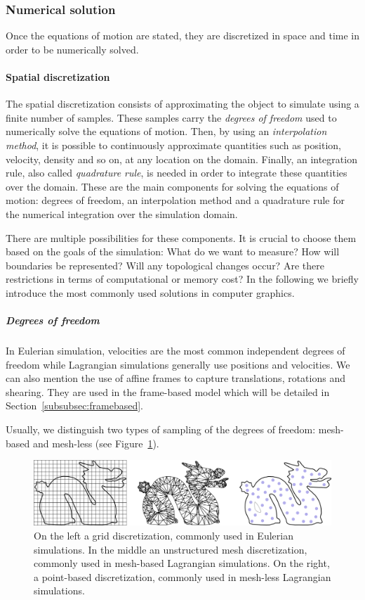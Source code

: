 \subsubsection{Numerical solution}
\label{subsubsec:starMechanics_numericalSolution}
Once the equations of motion are stated, they are discretized in space and time in order to be numerically solved.

\paragraph{Spatial discretization}
The spatial discretization consists of approximating the object to simulate using a finite number of samples. 
These samples carry the \emph{degrees of freedom} used to numerically solve the equations of motion.
Then, by using an \emph{interpolation method}, it is possible to continuously approximate quantities such as position, velocity, density and so on, at any location on the domain. 
Finally, an integration rule, also called \emph{quadrature rule}, is needed in order to integrate these quantities over the domain. 
These are the main components for solving the equations of motion:
degrees of freedom, an interpolation method and a quadrature rule for the numerical integration over the simulation domain.

There are multiple possibilities for these components. It is crucial to choose them based on the goals of the simulation: What do we want to measure? How will boundaries be represented? Will any topological changes occur? Are there restrictions in terms of computational or memory cost? In the following we briefly introduce the most commonly used solutions in computer graphics.

\subparagraph{Degrees of freedom}
In Eulerian simulation, velocities are the most common independent degrees of freedom while Lagrangian simulations generally use positions and velocities. 
We can also mention the use of affine frames to capture translations, rotations and shearing. They are used in the frame-based model which will be detailed in Section~\ref{subsubsec:framebased}.

Usually, we distinguish two types of sampling of the degrees of freedom: mesh-based and mesh-less (see Figure~\ref{fig:discretization}).
\begin{figure}[!h]
	\centering
	\includegraphics[width=\linewidth]{images/continuum_mechanics/discretization.png}
	\caption[STAR mechanics: Discretization]{\label{fig:discretization} On the left a grid discretization, commonly used in Eulerian simulations. In the middle an unstructured mesh discretization, commonly used in mesh-based Lagrangian simulations. On the right, a point-based discretization, commonly used in mesh-less Lagrangian simulations.}
\end{figure}

